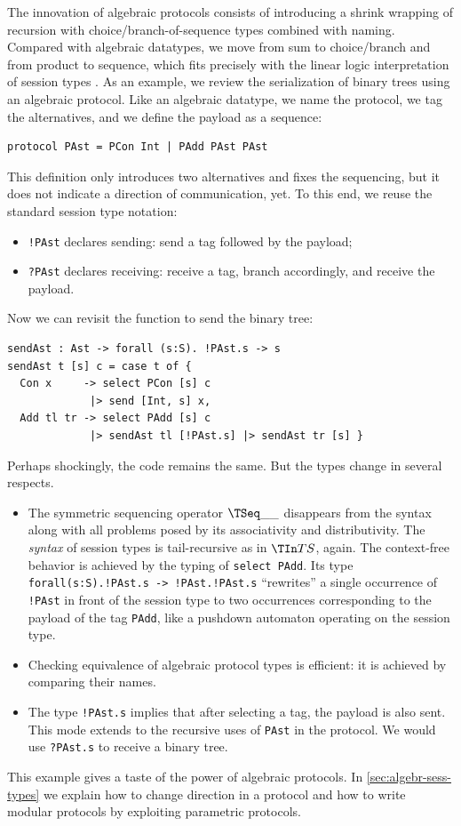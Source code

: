 The innovation of algebraic protocols consists of introducing a
shrink wrapping of recursion with choice/branch-of-sequence types combined
with naming. Compared with algebraic datatypes, we move from sum to
choice/branch and from product to sequence, which fits precisely with
the linear logic interpretation of session types \cite{DBLP:journals/mscs/CairesPT16}. 
As an example, we review the serialization of binary trees using an
algebraic protocol. Like an algebraic datatype, we name the protocol,
we tag the alternatives, and we define the payload as a sequence:
\begin{lstlisting}
protocol PAst = PCon Int | PAdd PAst PAst
\end{lstlisting}
This definition only introduces two alternatives and fixes the
sequencing, but it does not indicate a direction of communication,
yet. To this end, we reuse the standard session type notation:
\begin{itemize}
\item \lstinline/!PAst/ declares sending: send a tag followed by the payload;
\item \lstinline/?PAst/ declares receiving: receive a tag, branch
  accordingly, and receive the payload.
\end{itemize}
Now we can revisit the function to send the binary tree:
\begin{lstlisting}
sendAst : Ast -> forall (s:S). !PAst.s -> s
sendAst t [s] c = case t of {
  Con x     -> select PCon [s] c
             |> send [Int, s] x,
  Add tl tr -> select PAdd [s] c
             |> sendAst tl [!PAst.s] |> sendAst tr [s] }
\end{lstlisting}
Perhaps shockingly, the code remains the same. But the types change in
several respects.
\begin{itemize}
\item The symmetric sequencing operator $\TSeq\_\_$ disappears from the syntax along with all
  problems posed by its associativity and distributivity. The
  \emph{syntax} of session types is tail-recursive as in $\TIn TS$,
  again. The context-free behavior is achieved by the typing of
  \lstinline/select PAdd/. Its type \lstinline/forall(s:S).!PAst.s -> !PAst.!PAst.s/
  ``rewrites'' a single occurrence of \lstinline/!PAst/ in front of
  the session type to two occurrences corresponding to the payload of
  the tag \lstinline/PAdd/, like a pushdown automaton operating on
  the session type.
\item Checking equivalence of algebraic protocol types is efficient:
  it is achieved by comparing their names.
\item The type \lstinline/!PAst.s/ implies that after selecting a tag,
  the payload is also sent. This mode extends to the recursive uses of
  \lstinline/PAst/ in the protocol. We would use \lstinline/?PAst.s/
  to receive a binary tree. 
\end{itemize}
This example gives a taste of the power of algebraic protocols.
In \cref{sec:algebr-sess-types} we explain how to change direction in
a protocol and how to write modular protocols by exploiting parametric
protocols.



